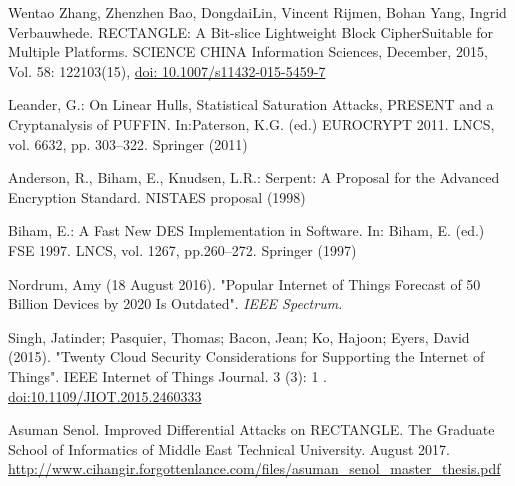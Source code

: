 \documentclass[final]{transcrypto}
\begin{document}
\begin{thebibliography}{9}
Wentao Zhang, Zhenzhen Bao, DongdaiLin, Vincent Rijmen, Bohan Yang, Ingrid Verbauwhede. RECTANGLE: A Bit-slice Lightweight Block CipherSuitable for Multiple Platforms. SCIENCE CHINA Information Sciences, December, 2015, Vol. 58: 122103(15), \href{https://www.doi.org/10.1007/s11432-015-5459-7}{doi: 10.1007/s11432-015-5459-7}


Leander, G.: On Linear Hulls, Statistical Saturation Attacks, PRESENT and a Cryptanalysis of PUFFIN. In:Paterson, K.G. (ed.) EUROCRYPT 2011. LNCS, vol. 6632, pp. 303–322. Springer (2011)


Anderson, R., Biham, E., Knudsen, L.R.: Serpent: A Proposal for the Advanced Encryption Standard. NISTAES proposal (1998)

Biham, E.: A Fast New DES Implementation in Software. In: Biham, E. (ed.) FSE 1997. LNCS, vol. 1267, pp.260–272. Springer (1997)

Nordrum, Amy (18 August 2016). "Popular Internet of Things Forecast of 50 Billion Devices by 2020 Is Outdated". \textit{IEEE Spectrum}.

Singh, Jatinder; Pasquier, Thomas; Bacon, Jean; Ko, Hajoon; Eyers, David (2015). "Twenty Cloud Security Considerations for Supporting the Internet of Things". IEEE Internet of Things Journal. 3 (3): 1 . \href{https://doi.org/10.1109\%2FJIOT.2015.2460333}{doi:10.1109/JIOT.2015.2460333}

Asuman Senol. Improved Differential Attacks on RECTANGLE. The Graduate School of Informatics of Middle East Technical University. August 2017. \href{http://www.cihangir.forgottenlance.com/files/asuman_senol_master_thesis.pdf}{http://www.cihangir.forgottenlance.com/files/asuman\_senol\_master\_thesis.pdf}
\end{thebibliography}
\end{document}
